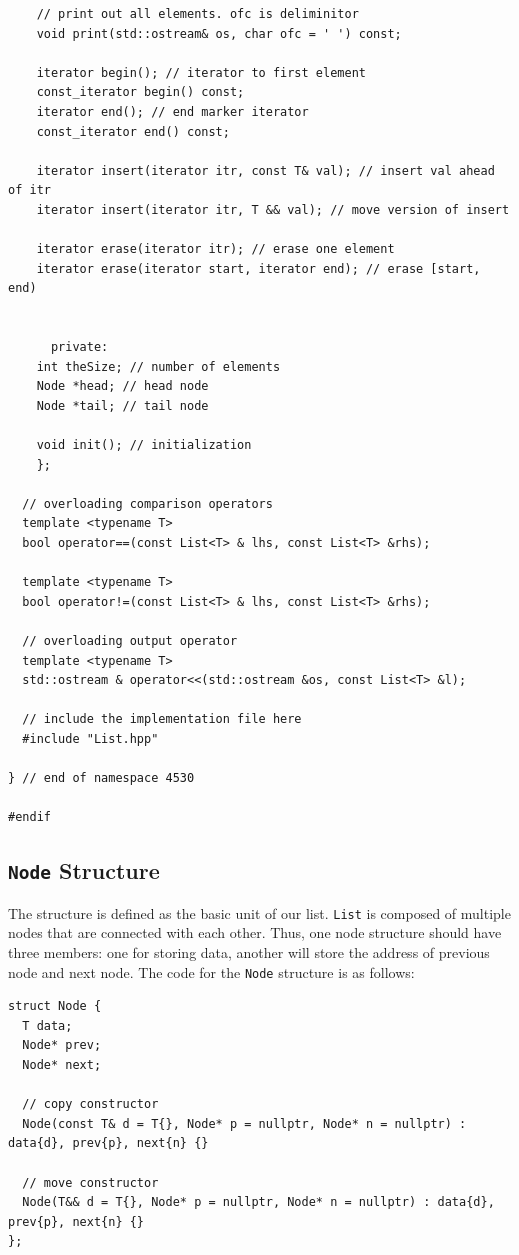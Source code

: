 \documentclass[12pt]{book}
\begin{document}
\begin{verbatim}
	// print out all elements. ofc is deliminitor
	void print(std::ostream& os, char ofc = ' ') const; 

	iterator begin(); // iterator to first element
	const_iterator begin() const;
	iterator end(); // end marker iterator
	const_iterator end() const; 

	iterator insert(iterator itr, const T& val); // insert val ahead of itr
	iterator insert(iterator itr, T && val); // move version of insert

	iterator erase(iterator itr); // erase one element
	iterator erase(iterator start, iterator end); // erase [start, end)


      private:
	int theSize; // number of elements
	Node *head; // head node
	Node *tail; // tail node

	void init(); // initialization
    };

  // overloading comparison operators
  template <typename T>
  bool operator==(const List<T> & lhs, const List<T> &rhs);

  template <typename T>
  bool operator!=(const List<T> & lhs, const List<T> &rhs);

  // overloading output operator
  template <typename T>
  std::ostream & operator<<(std::ostream &os, const List<T> &l);

  // include the implementation file here
  #include "List.hpp"

} // end of namespace 4530

#endif

\end{verbatim}
\subsection{\texttt{Node} Structure}
\label{sec:org972a7d2}
The structure is defined as the basic unit of our list. \texttt{List} is composed of multiple nodes that are connected with each other. Thus, one node structure should have three members: one for storing data, another will store the address of previous node and next node. The code for the \texttt{Node} structure is as follows:
\begin{verbatim}
struct Node {
  T data;
  Node* prev;
  Node* next;

  // copy constructor
  Node(const T& d = T{}, Node* p = nullptr, Node* n = nullptr) : data{d}, prev{p}, next{n} {}

  // move constructor
  Node(T&& d = T{}, Node* p = nullptr, Node* n = nullptr) : data{d}, prev{p}, next{n} {}
};
\end{verbatim}
\end{document}
